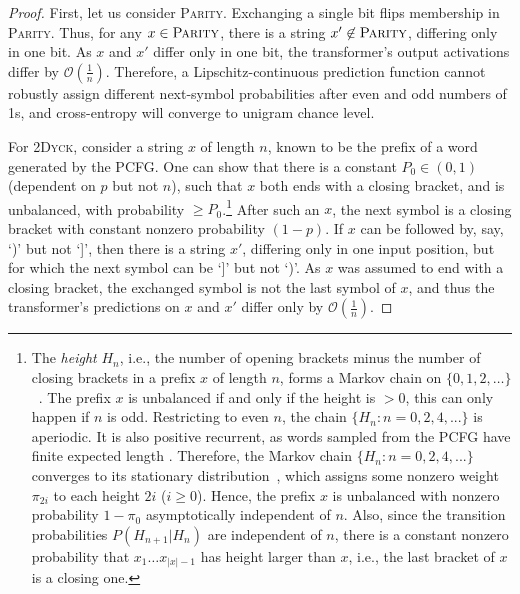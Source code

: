 \documentclass[11pt,a4paper]{article}
\begin{document}
\begin{proof}
First, let us consider \textsc{Parity}.
Exchanging a single bit flips membership in \textsc{Parity}.
Thus, for any $x \in \textsc{Parity}$, there is a string $x' \not\in \textsc{Parity}$, differing only in one bit.
As $x$ and $x'$ differ only in one bit, the transformer's output activations differ by $\mathcal{O}(\frac{1}{n})$.
Therefore, a Lipschitz-continuous prediction function cannot robustly assign different next-symbol probabilities after even and odd numbers of 1s, and cross-entropy will converge to unigram chance level.

For \textsc{2Dyck}, consider a string $x$ of length $n$, known to be the prefix of a word generated by the PCFG.
One can show that there is a constant $P_0 \in (0,1)$ (dependent on $p$ but not $n$), such that $x$ both ends with a closing bracket, and is unbalanced, with probability $\geq P_0$.\footnote{%
The \emph{height} $H_{n}$, i.e., the number of opening brackets minus the number of closing brackets in a prefix $x$ of length $n$, forms a Markov chain on $\{0, 1, 2, \dots\}$~\citep{keener1992limit}.
The prefix $x$ is unbalanced if and only if the height is $>0$, this can only happen if $n$ is odd.
Restricting to even $n$, the chain $\{H_{n} : n = 0, 2, 4, ...\}$ is aperiodic.
It is also positive recurrent, as words sampled from the PCFG have finite expected length \citep[2.2.1]{skachkova2018closing}.
Therefore, the Markov chain $\{H_{n} : n = 0, 2, 4, ...\}$ converges to its stationary distribution~\cite{mitzenmacherprobability}, which assigns some nonzero weight $\pi_{2i}$ to each height  $2i$ ($i \geq 0$).
Hence, the prefix $x$ is unbalanced with nonzero probability $1-\pi_0$ asymptotically independent of $n$.
Also, since the transition probabilities $P(H_{n+1}|H_n)$ are independent of $n$, there is a constant nonzero probability that $x_1\dots x_{|x|-1}$ has height larger than $x$, i.e., the last bracket of $x$ is a closing one.}
After such an $x$, the next symbol is a closing bracket with constant nonzero probability $(1-p)$.
If $x$ can be followed by, say, `)' but not `]', then there is a string $x'$, differing only in one input position, but for which the next symbol can be `]' but not `)'.
As $x$ was assumed to end with a closing bracket, the exchanged symbol is not the last symbol of $x$, and thus the transformer's predictions on $x$ and $x'$ differ only by $\mathcal{O}(\frac{1}{n})$.

\end{proof}
\end{document}
